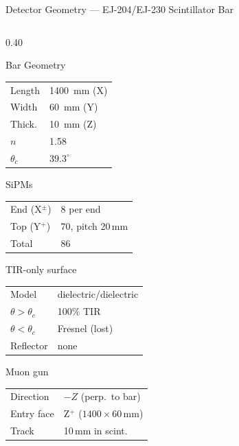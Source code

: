 \documentclass[aspectratio=169,10pt]{beamer}
\begin{document}
\begin{frame}{Detector Geometry --- EJ-204/EJ-230 Scintillator Bar}
\begin{columns}[T]
  \begin{column}{0.40\textwidth}
  \footnotesize
  \begin{block}{Bar Geometry}
    \begin{tabular}{@{}ll@{}}
      Length & \SI{1400}{mm} (X) \\
      Width  & \SI{60}{mm}  (Y) \\
      Thick. & \SI{10}{mm}  (Z) \\
      $n$    & 1.58 \\
      $\theta_c$ & $39.3^\circ$ \\
    \end{tabular}
  \end{block}

  \begin{block}{SiPMs}
    \begin{tabular}{@{}ll@{}}
      End (X$^\pm$) & 8 per end \\
      Top (Y$^+$)   & 70, pitch 20\,mm \\
      Total         & 86 \\
    \end{tabular}
  \end{block}

  \begin{block}{TIR-only surface}
    \begin{tabular}{@{}ll@{}}
      Model & dielectric/dielectric \\
      $\theta>\theta_c$ & 100\% TIR \\
      $\theta<\theta_c$ & Fresnel (lost) \\
      Reflector & none \\
    \end{tabular}
  \end{block}

  \begin{block}{Muon gun}
    \begin{tabular}{@{}ll@{}}
      Direction & $-Z$ (perp.\ to bar) \\
      Entry face & Z$^+$ ($1400\!\times\!60$\,mm) \\
      Track & 10\,mm in scint. \\
    \end{tabular}
  \end{block}
  \end{column}
\end{columns}

\end{frame}
\end{document}
